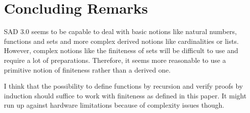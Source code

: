 \documentclass[10pt]{article}
\theoremstyle{definition}
\theoremstyle{plain}
\theoremstyle{remark}
\begin{document}
\section{Concluding Remarks} SAD 3.0 seems to be capable to deal with basic notions like natural numbers, functions and sets and more complex derived notions like cardinalities or lists. However, complex notions like the finiteness of sets will be difficult to use and require a lot of preparations. Therefore, it seems more reasonable to use a primitive notion of finiteness rather than a derived one. 

I think that the possibility to define functions by recursion and verify proofs by induction should suffice to work with finiteness as defined in this paper. It might run up against hardware limitations because of complexity issues though.
\end{document}
